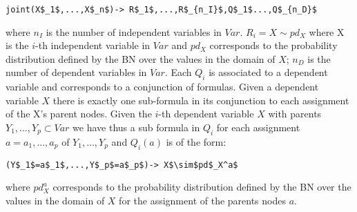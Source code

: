 \documentclass[letterpaper]{article}
\theoremstyle{plain}
\theoremstyle{definition}
\theoremstyle{remark}
\theoremstyle{definition}
\begin{document}
\begin{lstlisting}[mathescape=true]
joint(X$_1$,...,X$_n$)-> R$_1$,...,R$_{n_I}$,Q$_1$...,Q$_{n_D}$
  \end{lstlisting}
where 
$n_I$ is the number of independent variables in $Var$. $R_i= X \sim pd_X$ where X is the $i$-th independent variable in $Var$ and $pd_X$ corresponds to the probability distribution defined by the BN over the values in the domain of $X$;
$n_D$ is the number of dependent variables in $Var$. Each $Q_i$ is associated to a dependent variable and corresponds to a conjunction of formulas. Given a dependent variable $X$ there is exactly one sub-formula in its conjunction to each assignment of the X's parent nodes. Given the $i$-th dependent variable $X$ with parents $Y_1, \ldots, Y_p \subset Var$ we have thus a sub formula in $Q_i$ for each assignment $a=a_1,\ldots,a_p$ of $Y_1, \ldots, Y_p$ and $Q_i(a)$ is of the form:
\begin{lstlisting}[mathescape=true]
(Y$_1$=a$_1$,...,Y$_p$=a$_p$)-> X$\sim$pd$_X^a$
\end{lstlisting}
where $ pd_X^a$ corresponds to the probability distribution defined by the BN over the values in the domain of $X$ for the assignment of the parents nodes $a$.
\end{document}
